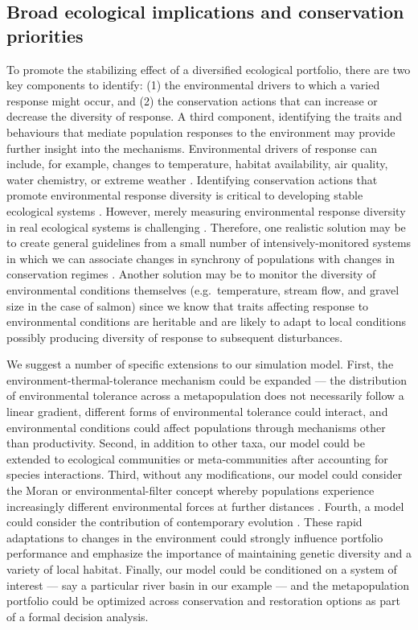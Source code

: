 \documentclass[12pt,english]{article}
\begin{document}
\begin{spacing}{1.9}
\subsection{Broad ecological implications and conservation priorities}\label{broad-ecological-implications-and-conservation-priorities}

To promote the stabilizing effect of a diversified ecological portfolio, there are two key components to identify: (1) the environmental drivers to which a varied response might occur, and (2) the conservation actions that can increase or decrease the diversity of response. A third component, identifying the traits and behaviours that mediate population responses to the environment may provide further insight into the mechanisms. Environmental drivers of response can include, for example, changes to temperature, habitat availability, air quality, water chemistry, or extreme weather \citep{elmqvist2003}. Identifying conservation actions that promote environmental response diversity is critical to developing stable ecological systems \citep{mori2013}. However, merely measuring environmental response diversity in real ecological systems is challenging \citep[albeit possible;][]{thibaut2012}. Therefore, one realistic solution may be to create general guidelines from a small number of intensively-monitored systems in which we can associate changes in synchrony of populations with changes in conservation regimes \citep[e.g.][]{moore2010, carlson2011}. Another solution may be to monitor the diversity of environmental conditions themselves (e.g.~temperature, stream flow, and gravel size in the case of salmon) since we know that traits affecting response to environmental conditions are heritable and are likely to adapt to local conditions \citep{carlson2011} possibly producing diversity of response to subsequent disturbances.

We suggest a number of specific extensions to our simulation model. First, the environment-thermal-tolerance mechanism could be expanded --- the distribution of environmental tolerance across a metapopulation does not necessarily follow a linear gradient, different forms of environmental tolerance could interact, and environmental conditions could affect populations through mechanisms other than productivity. Second, in addition to other taxa, our model could be extended to ecological communities or meta-communities after accounting for species interactions. Third, without any modifications, our model could consider the Moran or environmental-filter concept whereby populations experience increasingly different environmental forces at further distances \citep{schindler2008, rogers2008}. Fourth, a model could consider the contribution of contemporary evolution \citep{stockwell2003}. These rapid adaptations to changes in the environment could strongly influence portfolio performance and emphasize the importance of maintaining genetic diversity and a variety of local habitat. Finally, our model could be conditioned on a system of interest --- say a particular river basin in our example --- and the metapopulation portfolio could be optimized across conservation and restoration options as part of a formal decision analysis.


\end{spacing}
\end{document}
